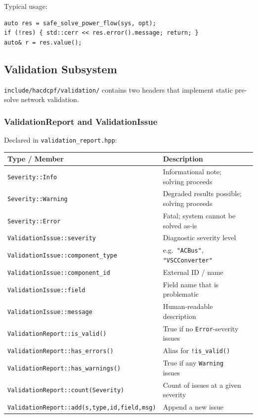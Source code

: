 Typical usage:
\begin{verbatim}
auto res = safe_solve_power_flow(sys, opt);
if (!res) { std::cerr << res.error().message; return; }
auto& r = res.value();
\end{verbatim}

\subsection{Validation Subsystem}
\label{sec:validation-deep}

\texttt{include/hacdcpf/validation/} contains two headers that implement
static pre-solve network validation.

\subsubsection{ValidationReport and ValidationIssue}

Declared in \texttt{validation\_report.hpp}:

\begin{center}
\begin{tabular}{lll}
\hline\hline
\textbf{Type / Member} & \textbf{Description} \\
\hline
\texttt{Severity::Info} & Informational note; solving proceeds \\
\texttt{Severity::Warning} & Degraded results possible; solving proceeds \\
\texttt{Severity::Error} & Fatal; system cannot be solved as-is \\
\hline
\texttt{ValidationIssue::severity} & Diagnostic severity level \\
\texttt{ValidationIssue::component\_type} & e.g.\ \texttt{"ACBus"}, \texttt{"VSCConverter"} \\
\texttt{ValidationIssue::component\_id} & External ID / name \\
\texttt{ValidationIssue::field} & Field name that is problematic \\
\texttt{ValidationIssue::message} & Human-readable description \\
\hline
\texttt{ValidationReport::is\_valid()} & True if no \texttt{Error}-severity issues \\
\texttt{ValidationReport::has\_errors()} & Alias for \texttt{!is\_valid()} \\
\texttt{ValidationReport::has\_warnings()} & True if any \texttt{Warning} issues \\
\texttt{ValidationReport::count(Severity)} & Count of issues at a given severity \\
\texttt{ValidationReport::add(s,type,id,field,msg)} & Append a new issue \\
\hline\hline
\end{tabular}
\end{center}

